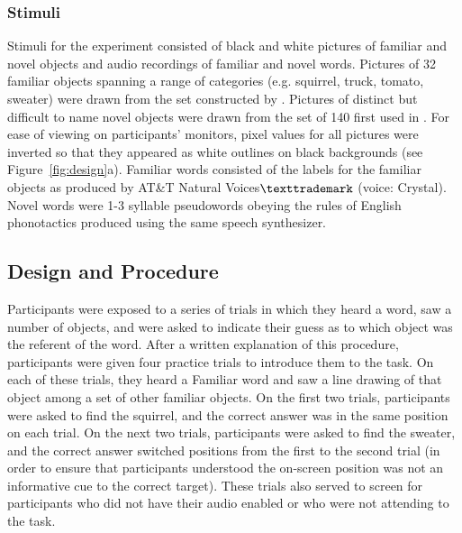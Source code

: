 \documentclass[man,floatsintext]{apa6}
\begin{document}
\subsubsection{Stimuli}

Stimuli for the experiment consisted of black and white pictures of familiar and novel objects and audio recordings of familiar and novel words. Pictures of 32 familiar objects spanning a range of categories (e.g. squirrel, truck, tomato, sweater) were drawn from the set constructed by . Pictures of distinct but difficult to name novel objects were drawn from the set of 140 first used in . For ease of viewing on participants' monitors, pixel values for all pictures were inverted so that they appeared as white outlines on black backgrounds (see Figure~\ref{fig:design}a). Familiar words consisted of the labels for the familiar objects as produced by AT\&T Natural Voices$\texttrademark$ (voice: Crystal). Novel words were 1-3 syllable pseudowords obeying the rules of English phonotactics produced using the same speech synthesizer. 
\subsection{Design and Procedure}

Participants were exposed to a series of trials in which they heard a word, saw a number of objects, and were asked to indicate their guess as to which object was the referent of the word. After a written explanation of this procedure, participants were given four practice trials to introduce them to the task. On each of these trials, they heard a Familiar word and saw a line drawing of that object among a set of other familiar objects. On the first two trials, participants were asked to find the squirrel, and the correct answer was in the same position on each trial. On the next two trials, participants were asked to find the sweater, and the correct answer switched positions from the first to the second trial (in order to ensure that participants understood the on-screen position was not an informative cue to the correct target). These trials also served to screen for participants who did not have their audio enabled or who were not attending to the task.
\end{document}
